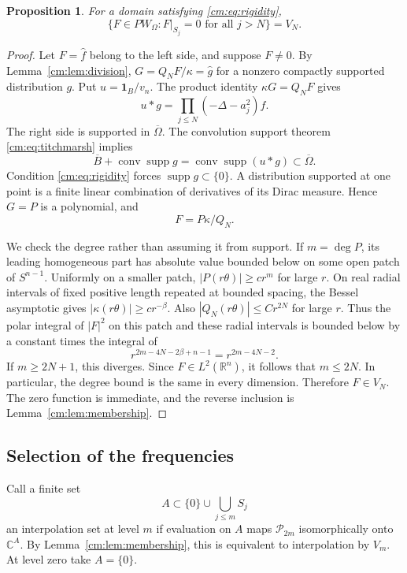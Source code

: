\documentclass[a4paper,12pt,reqno]{amsart}
\newtheorem{proposition}[theorem]{Proposition}
\theoremstyle{remark}
\numberwithin{equation}{section}
\newcommand{\R}{\mathbb R}
\newcommand{\C}{\mathbb C}
\newcommand{\one}{\mathbf 1}
\DeclareMathOperator{\supp}{supp}
\DeclareMathOperator{\conv}{conv}
\newcommand{\cP}{\mathcal P}
\begin{document}
\begin{proposition}\label{cm:prop:tail}
For a domain satisfying \eqref{cm:eq:rigidity},
\begin{equation}\label{cm:eq:tail}
 \{F\in PW_\Omega:F|_{S_j}=0\text{ for all }j>N\}=V_N.
\end{equation}
\end{proposition}

\begin{proof}
Let $F=\widehat f$ belong to the left side, and suppose $F\ne0$.
By Lemma~\ref{cm:lem:division}, $G=Q_NF/\kappa=\widehat g$ for
a nonzero compactly supported distribution $g$. Put $u=\one_B/v_n$.
The product identity $\kappa G=Q_NF$ gives
\begin{equation}\label{cm:eq:convolution}
 u*g=\prod_{j\leq N}(-\Delta-a_j^2)f.
\end{equation}
The right side is supported in $\overline\Omega$.
The convolution support theorem \eqref{cm:eq:titchmarsh} implies
\[
 \overline B+\conv\supp g
      =\conv\supp(u*g)\subset\overline\Omega.
\]
Condition \eqref{cm:eq:rigidity} forces $\supp g\subset\{0\}$.
A distribution supported at one point is a finite linear combination
of derivatives of its Dirac measure. Hence $G=P$ is a polynomial,
and
\[
 F=P\kappa/Q_N.
\]

We check the degree rather than assuming it from support. If
$m=\deg P$, its leading homogeneous part has absolute value bounded
below on some open patch of $S^{n-1}$. Uniformly on a smaller patch,
$|P(r\theta)|\geq c r^m$ for large $r$.
On real radial intervals of fixed positive length repeated at
bounded spacing, the Bessel asymptotic gives
$|\kappa(r\theta)|\geq c r^{-\beta}$.
Also $|Q_N(r\theta)|\leq C r^{2N}$ for large $r$.
Thus the polar integral of $|F|^2$ on this patch and these radial
intervals is bounded below by a constant times the integral of
\[
 r^{2m-4N-2\beta+n-1}=r^{2m-4N-2}.
\]
If $m\geq2N+1$, this diverges. Since $F\in L^2(\R^n)$, it
follows that $m\leq2N$. In particular, the degree bound is the
same in every dimension.
Therefore $F\in V_N$. The zero function is immediate, and the
reverse inclusion is Lemma~\ref{cm:lem:membership}.
\end{proof}

\subsection{Selection of the frequencies}

Call a finite set
\[
 A\subset\{0\}\cup\bigcup_{j\leq m}S_j
\]
an interpolation set at level $m$ if evaluation on $A$ maps
$\cP_{2m}$ isomorphically onto $\C^A$. By
Lemma~\ref{cm:lem:membership}, this is equivalent to interpolation
by $V_m$. At level zero take $A=\{0\}$.
\end{document}
